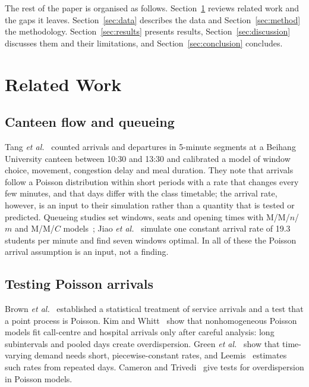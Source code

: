 \documentclass[conference,a4paper]{IEEEtran}
\begin{document}
The rest of the paper is organised as follows. Section~\ref{sec:related} reviews related work and the gaps it leaves.
Section~\ref{sec:data} describes the data and Section~\ref{sec:method} the methodology. Section~\ref{sec:results}
presents results, Section~\ref{sec:discussion} discusses them and their limitations, and Section~\ref{sec:conclusion}
concludes.

\section{Related Work}\label{sec:related}

\subsection{Canteen flow and queueing}
Tang \textit{et al.}~\cite{tang2019a} counted arrivals and departures in 5-minute segments at a Beihang University
canteen between 10:30 and 13:30 and calibrated a model of window choice, movement, congestion delay and meal duration.
They note that arrivals follow a Poisson distribution within short periods with a rate that changes every few minutes,
and that days differ with the class timetable; the arrival rate, however, is an input to their simulation rather than a
quantity that is tested or predicted. Queueing studies set windows, seats and opening times with M/M/$n$/$m$ and
M/M/$C$ models~\cite{chen2011,yuan2023}; Jiao \textit{et al.}~\cite{jiao2022} simulate one constant arrival rate of
19.3 students per minute and find seven windows optimal. In all of these the Poisson arrival assumption is an input,
not a finding.

\subsection{Testing Poisson arrivals}
Brown \textit{et al.}~\cite{brown2005} established a statistical treatment of service arrivals and a test that a point
process is Poisson. Kim and Whitt~\cite{kim2014} show that nonhomogeneous Poisson models fit call-centre and hospital
arrivals only after careful analysis: long subintervals and pooled days create overdispersion. Green
\textit{et al.}~\cite{green2007} show that time-varying demand needs short, piecewise-constant rates, and
Leemis~\cite{leemis1991} estimates such rates from repeated days. Cameron and Trivedi~\cite{cameron1990} give tests for
overdispersion in Poisson models.
\end{document}
